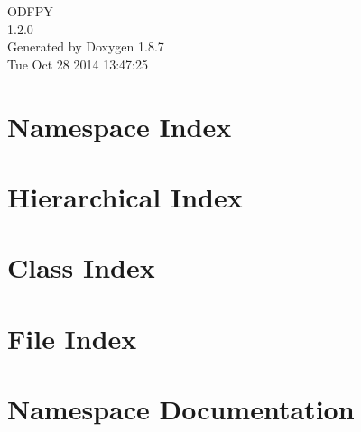 \documentclass[twoside]{book}
\newcommand{\+}{\discretionary{\mbox{\scriptsize$\hookleftarrow$}}{}{}}
\newcommand{\clearemptydoublepage}{%
  \newpage{\pagestyle{empty}\cleardoublepage}%
}
\begin{document}
\hypersetup{pageanchor=false,
             bookmarks=true,
             bookmarksnumbered=true,
             pdfencoding=unicode
            }
\begin{titlepage}
\vspace*{7cm}
\begin{center}%
{\Large O\+D\+F\+P\+Y \\[1ex]\large 1.\+2.\+0 }\\
\vspace*{1cm}
{\large Generated by Doxygen 1.8.7}\\
\vspace*{0.5cm}
{\small Tue Oct 28 2014 13:47:25}\\
\end{center}
\end{titlepage}
\clearemptydoublepage
\tableofcontents
\clearemptydoublepage
{}
\hypersetup{pageanchor=true}

\chapter{Namespace Index}

\chapter{Hierarchical Index}

\chapter{Class Index}

\chapter{File Index}

\chapter{Namespace Documentation}


































\end{document}
